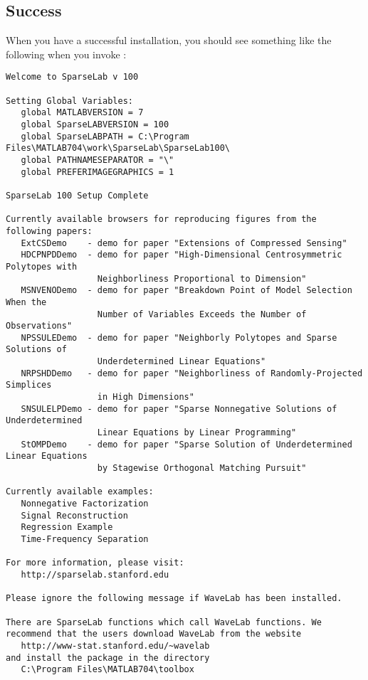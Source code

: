 \documentclass{article}
\begin{document}
\subsection{Success}

When you have a successful installation,
you should see something like the following when you invoke \Matlab:

\begin{verbatim}
Welcome to SparseLab v 100

Setting Global Variables:
   global MATLABVERSION = 7
   global SparseLABVERSION = 100
   global SparseLABPATH = C:\Program Files\MATLAB704\work\SparseLab\SparseLab100\
   global PATHNAMESEPARATOR = "\"
   global PREFERIMAGEGRAPHICS = 1

SparseLab 100 Setup Complete

Currently available browsers for reproducing figures from the
following papers:
   ExtCSDemo    - demo for paper "Extensions of Compressed Sensing"
   HDCPNPDDemo  - demo for paper "High-Dimensional Centrosymmetric Polytopes with
                  Neighborliness Proportional to Dimension"
   MSNVENODemo  - demo for paper "Breakdown Point of Model Selection When the
                  Number of Variables Exceeds the Number of Observations"
   NPSSULEDemo  - demo for paper "Neighborly Polytopes and Sparse Solutions of
                  Underdetermined Linear Equations"
   NRPSHDDemo   - demo for paper "Neighborliness of Randomly-Projected Simplices
                  in High Dimensions"
   SNSULELPDemo - demo for paper "Sparse Nonnegative Solutions of Underdetermined
                  Linear Equations by Linear Programming"
   StOMPDemo    - demo for paper "Sparse Solution of Underdetermined Linear Equations
                  by Stagewise Orthogonal Matching Pursuit"

Currently available examples:
   Nonnegative Factorization
   Signal Reconstruction
   Regression Example
   Time-Frequency Separation

For more information, please visit:
   http://sparselab.stanford.edu

Please ignore the following message if WaveLab has been installed.

There are SparseLab functions which call WaveLab functions. We
recommend that the users download WaveLab from the website
   http://www-stat.stanford.edu/~wavelab
and install the package in the directory
   C:\Program Files\MATLAB704\toolbox


\end{verbatim}
\end{document}
